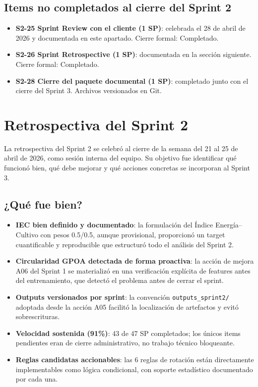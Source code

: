 \documentclass[11pt,a4paper]{article}
\begin{document}
\subsection{Items no completados al cierre del Sprint 2}

\begin{itemize}
  \item \textbf{S2-25 Sprint Review con el cliente (1 SP)}: celebrada el 28 de abril de 2026 y
    documentada en este apartado. Cierre formal: Completado.
  \item \textbf{S2-26 Sprint Retrospective (1 SP)}: documentada en la sección siguiente. Cierre
    formal: Completado.
  \item \textbf{S2-28 Cierre del paquete documental (1 SP)}: completado junto con el cierre del
    Sprint 3. Archivos versionados en Git.
\end{itemize}

\section{Retrospectiva del Sprint 2}

La retrospectiva del Sprint 2 se celebró al cierre de la semana del 21 al 25 de abril de 2026,
como sesión interna del equipo. Su objetivo fue identificar qué funcionó bien, qué debe
mejorar y qué acciones concretas se incorporan al Sprint 3.

\subsection{¿Qué fue bien?}

\begin{itemize}
  \item \textbf{IEC bien definido y documentado}: la formulación del Índice Energía–Cultivo con
    pesos 0.5/0.5, aunque provisional, proporcionó un target cuantificable y reproducible que
    estructuró todo el análisis del Sprint 2.
  \item \textbf{Circularidad GPOA detectada de forma proactiva}: la acción de mejora A06 del Sprint
    1 se materializó en una verificación explícita de features antes del entrenamiento, que
    detectó el problema antes de cerrar el sprint.
  \item \textbf{Outputs versionados por sprint}: la convención \texttt{outputs\_sprint2/} adoptada
    desde la acción A05 facilitó la localización de artefactos y evitó sobrescrituras.
  \item \textbf{Velocidad sostenida (91\%)}: 43 de 47 SP completados; los únicos items pendientes
    eran de cierre administrativo, no trabajo técnico bloqueante.
  \item \textbf{Reglas candidatas accionables}: las 6 reglas de rotación están directamente
    implementables como lógica condicional, con soporte estadístico documentado por cada una.
\end{itemize}
\end{document}
